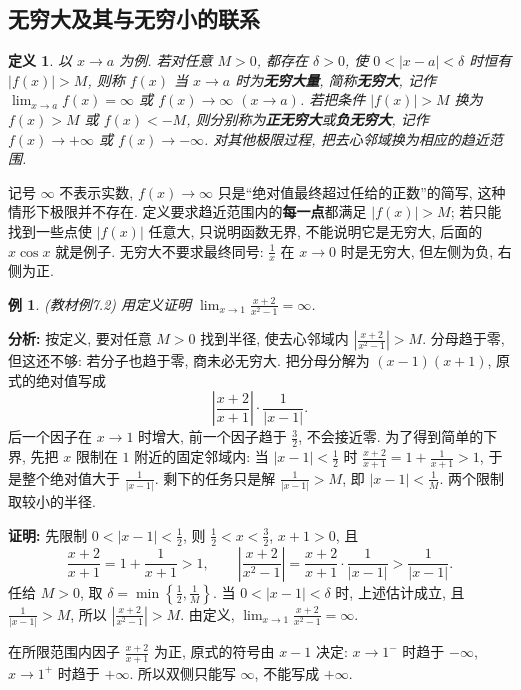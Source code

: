 \documentclass[UTF8,openany]{ctexbook}
\theoremstyle{chinesetextbook}
\newtheorem{definition}{定义}[section]
\newtheorem{example}{例}[section]
\newenvironment{cnproof}{\par\indent\textbf{证明:} \ignorespaces}{\par}
\begin{document}
\subsection{无穷大及其与无穷小的联系}
\begin{definition}
以 $x\to a$ 为例. 若对任意 $M>0$, 都存在 $\delta>0$, 使 $0<|x-a|<\delta$ 时恒有 $|f(x)|>M$, 则称 $f(x)$ 当 $x\to a$ 时为\textbf{无穷大量}, 简称\textbf{无穷大}, 记作 $\displaystyle\lim_{x\to a}f(x)=\infty$ 或 $f(x)\to\infty$ $(x\to a)$. 若把条件 $|f(x)|>M$ 换为 $f(x)>M$ 或 $f(x)<-M$, 则分别称为\textbf{正无穷大}或\textbf{负无穷大}, 记作 $f(x)\to+\infty$ 或 $f(x)\to-\infty$. 对其他极限过程, 把去心邻域换为相应的趋近范围.
\end{definition}
记号 $\infty$ 不表示实数, $f(x)\to\infty$ 只是“绝对值最终超过任给的正数”的简写, 这种情形下极限并不存在. 定义要求趋近范围内的\textbf{每一点}都满足 $|f(x)|>M$; 若只能找到一些点使 $|f(x)|$ 任意大, 只说明函数无界, 不能说明它是无穷大, 后面的 $x\cos x$ 就是例子. 无穷大不要求最终同号: $\displaystyle\frac1x$ 在 $x\to0$ 时是无穷大, 但左侧为负, 右侧为正.
\begin{example}
\textnormal{(教材例7.2)} 用定义证明 $\displaystyle \lim_{x\to1}\frac{x+2}{x^2-1}=\infty$.
\end{example}
\par\indent\textbf{分析:} 按定义, 要对任意 $M>0$ 找到半径, 使去心邻域内 $\displaystyle\left|\frac{x+2}{x^2-1}\right|>M$. 分母趋于零, 但这还不够: 若分子也趋于零, 商未必无穷大. 把分母分解为 $(x-1)(x+1)$, 原式的绝对值写成
\[
\left|\frac{x+2}{x+1}\right|\cdot\frac1{|x-1|}.
\]
后一个因子在 $x\to1$ 时增大, 前一个因子趋于 $\displaystyle\frac32$, 不会接近零. 为了得到简单的下界, 先把 $x$ 限制在 $1$ 附近的固定邻域内: 当 $\displaystyle|x-1|<\frac12$ 时 $\displaystyle\frac{x+2}{x+1}=1+\frac1{x+1}>1$, 于是整个绝对值大于 $\displaystyle\frac1{|x-1|}$. 剩下的任务只是解 $\displaystyle\frac1{|x-1|}>M$, 即 $\displaystyle|x-1|<\frac1M$. 两个限制取较小的半径.
\begin{cnproof}
先限制 $\displaystyle0<|x-1|<\frac12$, 则 $\displaystyle\frac12<x<\frac32$, $x+1>0$, 且
\[
\frac{x+2}{x+1}=1+\frac1{x+1}>1,
\qquad
\left|\frac{x+2}{x^2-1}\right|=\frac{x+2}{x+1}\cdot\frac1{|x-1|}>\frac1{|x-1|}.
\]
任给 $M>0$, 取 $\displaystyle\delta=\min\left\{\frac12,\frac1M\right\}$. 当 $0<|x-1|<\delta$ 时, 上述估计成立, 且 $\displaystyle\frac1{|x-1|}>M$, 所以 $\displaystyle\left|\frac{x+2}{x^2-1}\right|>M$. 由定义, $\displaystyle\lim_{x\to1}\frac{x+2}{x^2-1}=\infty$.

在所限范围内因子 $\displaystyle\frac{x+2}{x+1}$ 为正, 原式的符号由 $x-1$ 决定: $x\to1^-$ 时趋于 $-\infty$, $x\to1^+$ 时趋于 $+\infty$. 所以双侧只能写 $\infty$, 不能写成 $+\infty$.
\end{cnproof}
\end{document}
